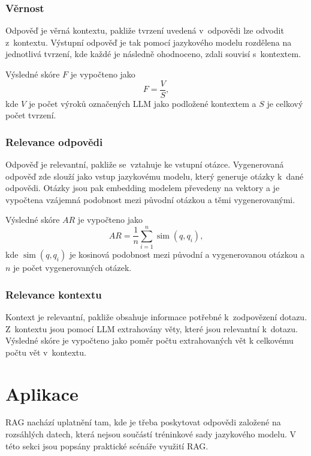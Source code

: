 \subsubsection{Věrnost}
Odpověď je věrná kontextu, pakliže tvrzení uvedená v~odpovědi lze odvodit z~kontextu. Výstupní odpověď je tak pomocí jazykového modelu rozdělena na jednotlivá tvrzení, kde každé je následně ohodnoceno, zdali souvisí s~kontextem.

Výsledné skóre $F$ je vypočteno jako
\begin{equation}
    F = \frac{V}{S}, 
\end{equation}
kde $V$ je počet výroků označených LLM jako podložené kontextem a $S$ je celkový počet tvrzení.

\subsubsection{Relevance odpovědi}
Odpověď je relevantní, pakliže se~vztahuje ke vstupní otázce. Vygenerovaná odpověď zde slouží jako vstup jazykovému modelu, který generuje otázky k~dané odpovědi. Otázky jsou pak embedding modelem převedeny na vektory a je vypočtena vzájemná podobnost mezi původní otázkou a těmi vygenerovanými.

Výsledné skóre $AR$ je vypočteno jako 
\begin{equation}
    AR = \frac{1}{n} \sum_{i=1}^{n} \operatorname{sim}(q, q_i),
\end{equation}
kde $\operatorname{sim}(q, q_i)$ je kosinová podobnost mezi původní a vygenerovanou otázkou a $n$ je počet vygenerovaných otázek.


\subsubsection{Relevance kontextu}
Kontext je relevantní, pakliže obsahuje informace potřebné k~zodpovězení dotazu. Z~kontextu jsou pomocí LLM extrahovány věty, které jsou relevantní k~dotazu. Výsledné skóre je vypočteno jako poměr počtu extrahovaných vět k celkovému počtu vět v~kontextu.

\section{Aplikace}
RAG nachází uplatnění tam, kde je třeba poskytovat odpovědi založené na rozsáhlých datech, která nejsou součástí tréninkové sady jazykového modelu. V této sekci jsou popsány praktické scénáře využití RAG.

